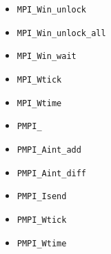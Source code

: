 \begin{multicols}{3}
\begin{itemize}
\item \texttt{MPI_Win_unlock}~\pageref{def:MPI_Win_unlock}
\item \texttt{MPI_Win_unlock_all}~\pageref{def:MPI_Win_unlock_all}
\item \texttt{MPI_Win_wait}~\pageref{def:MPI_Win_wait}
\item \texttt{MPI_Wtick}~\pageref{def:MPI_Wtick}
\item \texttt{MPI_Wtime}~\pageref{def:MPI_Wtime}
\item \texttt{PMPI_}~\pageref{def:PMPI_}
\item \texttt{PMPI_Aint_add}~\pageref{def:PMPI_Aint_add}
\item \texttt{PMPI_Aint_diff}~\pageref{def:PMPI_Aint_diff}
\item \texttt{PMPI_Isend}~\pageref{def:PMPI_Isend}
\item \texttt{PMPI_Wtick}~\pageref{def:PMPI_Wtick}
\item \texttt{PMPI_Wtime}~\pageref{def:PMPI_Wtime}
\end{itemize}
\end{multicols}
